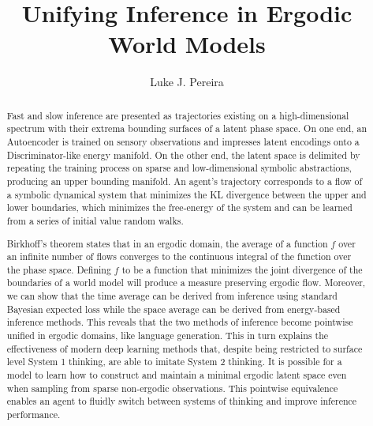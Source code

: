 \documentclass{article}
\title{Unifying Inference in Ergodic World Models}
\author{%
  Luke J. Pereira \\
}
\begin{document}
\maketitle

\begin{abstract}

Fast and slow inference are presented as trajectories existing on a high-dimensional spectrum with their extrema bounding surfaces of a latent phase space. On one end, an Autoencoder is trained on sensory observations and impresses latent encodings onto a Discriminator-like energy manifold. On the other end, the latent space is delimited by repeating the training process on sparse and low-dimensional symbolic abstractions, producing an upper bounding manifold. An agent's trajectory corresponds to a flow of a symbolic dynamical system that minimizes the KL divergence between the upper and lower boundaries, which minimizes the free-energy of the system and can be learned from a series of initial value random walks.

Birkhoff's theorem states that in an ergodic domain, the average of a function $f$ over an infinite number of flows converges to the continuous integral of the function over the phase space. Defining $f$ to be a function that minimizes the joint divergence of the boundaries of a world model will produce a measure preserving ergodic flow. Moreover, we can show that the time average can be derived from inference using standard Bayesian expected loss while the space average can be derived from energy-based inference methods. This reveals that the two methods of inference become pointwise unified in ergodic domains, like language generation. This in turn explains the effectiveness of modern deep learning methods that, despite being restricted to surface level System 1 thinking, are able to imitate System 2 thinking. It is possible for a model to learn how to construct and maintain a minimal ergodic latent space even when sampling from sparse non-ergodic observations. This pointwise equivalence enables an agent to fluidly switch between systems of thinking and improve inference performance.





\end{abstract}
\end{document}
